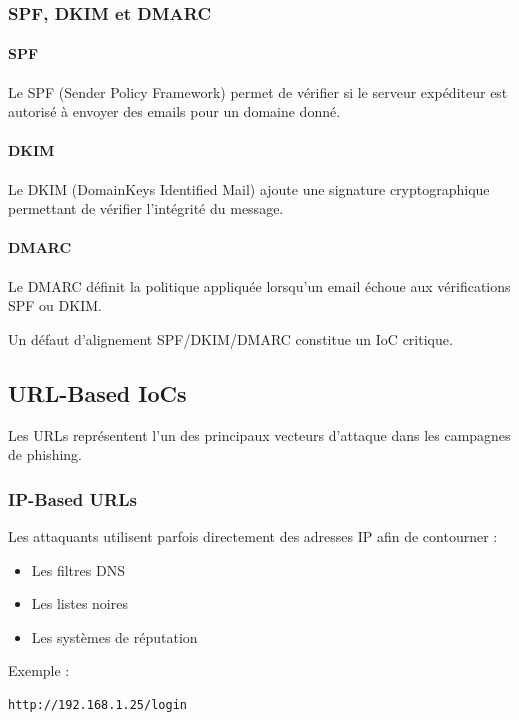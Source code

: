 \documentclass[12pt,a4paper]{article}
\begin{document}
\subsubsection{SPF, DKIM et DMARC}

\paragraph{SPF}
Le SPF (Sender Policy Framework) permet de vérifier si le serveur expéditeur est autorisé à envoyer des emails pour un domaine donné.

\paragraph{DKIM}
Le DKIM (DomainKeys Identified Mail) ajoute une signature cryptographique permettant de vérifier l'intégrité du message.

\paragraph{DMARC}
Le DMARC définit la politique appliquée lorsqu'un email échoue aux vérifications SPF ou DKIM.

Un défaut d'alignement SPF/DKIM/DMARC constitue un IoC critique.

\subsection{URL-Based IoCs}

Les URLs représentent l'un des principaux vecteurs d'attaque dans les campagnes de phishing.

\subsubsection{IP-Based URLs}

Les attaquants utilisent parfois directement des adresses IP afin de contourner :
\begin{itemize}
    \item Les filtres DNS
    \item Les listes noires
    \item Les systèmes de réputation
\end{itemize}

Exemple :
\begin{verbatim}
http://192.168.1.25/login
\end{verbatim}
\end{document}
